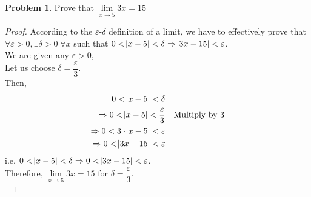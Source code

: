 \documentclass[14]{article}
\theoremstyle{definition}
\newtheorem{prob}{Problem}
\begin{document}
\begin{prob}
Prove that $\lim\limits_{x \to 5} 3x = 15$
\begin{proof}
According to the $\varepsilon$-$\delta$ definition of a limit, we have to effectively prove that $\forall \varepsilon > 0, \exists \delta > 0 \; \forall x$ such that $0 < \abs{x - 5} < \delta \Rightarrow \abs{3x - 15} < \varepsilon$.\\
We are given any $\varepsilon > 0$,\\
Let us choose $\delta = \dfrac{\varepsilon}{3}$.\\ Then,\\
\begin{align*}
0 < \abs{x - 5} < \delta &&\\
\Rightarrow 0 < \abs{x - 5} < \dfrac\varepsilon 3 && \text{Multiply by } 3\\
\Rightarrow 0 < 3\cdot \abs{x - 5} < \varepsilon\\
\Rightarrow 0 < \abs{3x - 15} < \varepsilon
\end{align*}
i.e. $0 < \abs{x - 5} < \delta \Rightarrow 0 < \abs{3x - 15} < \varepsilon$.\\
Therefore, $\lim\limits_{x \to 5} 3x = 15$ for $\delta = \dfrac{\varepsilon}{3}$.\\
\end{proof}
\end{prob}
\pagebreak
\end{document}
